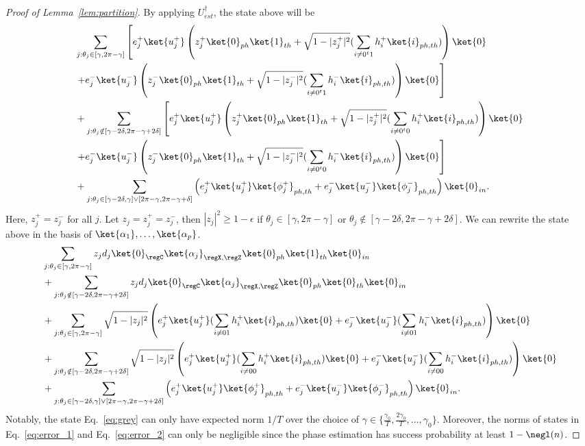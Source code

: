 \begin{proof}[Proof of Lemma~\ref{lem:partition}]
By applying $U_{est}^{\dag}$, the state above will be 
\begin{align}
    &\sum_{j: \theta_j\in [\gamma,2\pi-\gamma]} \left[e^+_j \ket{u^+_j} \left( z^+_j\ket{0}_{ph}\ket{1}_{th} + \sqrt{1-|z^+_j|^2} (\sum_{i\neq 0^t1} h^+_{i}\ket{i}_{ph,th}) \right)\ket{0}\right. \\
    &\left. +e^-_j \ket{u^-_j} \left( z^-_j\ket{0}_{ph}\ket{1}_{th} + \sqrt{1-|z^-_j|^2} (\sum_{i\neq 0^t1} h^-_{i}\ket{i}_{ph,th}) \right)\ket{0}\right]\\
    &+\sum_{j: \theta_j\notin [\gamma-2\delta,2\pi-\gamma+2\delta]} \left[e^+_j \ket{u^+_j} \left( z^+_j\ket{0}_{ph}\ket{1}_{th} + \sqrt{1-|z^+_j|^2} (\sum_{i\neq 0^t0} h^+_{i}\ket{i}_{ph,th}) \right)\ket{0}\right.\\
    &\left. +e^-_j \ket{u^-_j} \left( z^-_j\ket{0}_{ph}\ket{1}_{th} + \sqrt{1-|z^-_j|^2} (\sum_{i\neq 0^t0} h^-_{i}\ket{i}_{ph,th}) \right)\ket{0}\right]\\
    &+  \sum_{j: \theta_j \in [\gamma-2\delta,\gamma]\vee[2\pi - \gamma,2\pi - \gamma+\delta]} \left(e^+_j\ket{u^+_j}\ket{\phi_j^+}_{ph,th} + e^-_j\ket{u^-_j}\ket{\phi_j^-}_{ph,th}\right) \ket{0}_{in}.
\end{align}
Here, $z_j^+ = z_j^-$ for all $j$. Let $z_j = z_j^+ = z_j^-$, then
$|z_j|^2 \geq 1-\epsilon$ if $\theta_j\in [\gamma,2\pi-\gamma]$ or $\theta_j\notin [\gamma-2\delta,2\pi-\gamma+2\delta]$. We can rewrite the state above in the basis of $\ket{\alpha_1},\dots,\ket{\alpha_{p}}$. 
\begin{align}
    &\sum_{j: \theta_j\in [\gamma,2\pi-\gamma]} z_jd_j \ket{0}_{\regC}\ket{\alpha_j}_{\regX,\regZ} \ket{0}_{ph}\ket{1}_{th}\ket{0}_{in}\label{eq:correct1}\\
    &+ \sum_{j: \theta_j\notin [\gamma-2\delta,2\pi-\gamma+2\delta]} z_jd_j \ket{0}_{\regC}\ket{\alpha_j}_{\regX,\regZ} \ket{0}_{ph}\ket{0}_{th}\ket{0}_{in}\label{eq:correct2}\\
    &+ \sum_{j: \theta_j\in [\gamma,2\pi-\gamma]} \sqrt{1-|z_j|^2} \left(e^+_j  \ket{u^+_j}(\sum_{i\neq 01} h^+_{i}\ket{i}_{ph,th})\ket{0}+e^-_j \ket{u^-_j}(\sum_{i\neq 01} h^-_{i}\ket{i}_{ph,th})\right)\ket{0}\label{eq:error_1}\\
    &+ \sum_{j: \theta_j\notin [\gamma-2\delta,2\pi-\gamma+2\delta]}\sqrt{1-|z_j|^2} \left(e^+_j  \ket{u^+_j}(\sum_{i\neq 00} h^+_{i}\ket{i}_{ph,th})\ket{0}+e^-_j \ket{u^-_j}(\sum_{i\neq 00} h^-_{i}\ket{i}_{ph,th})\right)\ket{0}\label{eq:error_2}\\
    &+  \sum_{j: \theta_j \in [\gamma-2\delta,\gamma]\vee[2\pi - \gamma,2\pi - \gamma+2\delta]} \left(e^+_j\ket{u^+_j}\ket{\phi_j^+}_{ph,th} + e^-_j\ket{u^-_j}\ket{\phi_j^-}_{ph,th}\right) \ket{0}_{in}\label{eq:grey}.
\end{align}
Notably, the state Eq.~\ref{eq:grey} can only have expected norm $1/T$ over the choice of $\gamma\in \{\frac{\gamma_0}{T},\frac{2\gamma_0}{T},\dots,\gamma_0\}$. Moreover, the norms of states in Eq.~\ref{eq:error_1} and Eq.~\ref{eq:error_2} can only be negligible since the phase estimation has success probability at least $1-\negl(n)$.  



\end{proof}
